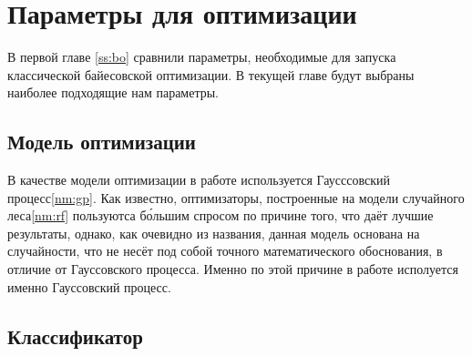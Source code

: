 \documentclass[times,specification,annotation]{itmo-student-thesis}
\begin{document}
	\section{Параметры для оптимизации}
	В первой главе \ref{ss:bo} сравнили параметры, необходимые для запуска классической байесовской оптимизации. В текущей главе будут выбраны наиболее подходящие нам параметры.
		\subsection{Модель оптимизации}
		В качестве модели оптимизации в работе используется Гаусссовский процесс\ref{nm:gp}. Как известно, оптимизаторы, построенные на модели случайного леса\ref{nm:rf} пользуютса б\'ольшим спросом по причине того, что даёт лучшие результаты, однако, как очевидно из названия, данная модель основана на случайности, что не несёт под собой точного математического обоснования, в отличие от Гауссовского процесса. Именно по этой причине в работе исполуется именно Гауссовский процесс.
		\subsection{Классификатор}
\end{document}
